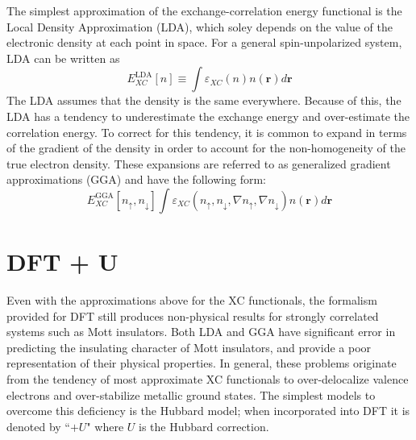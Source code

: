 \documentclass[12pt]{article}
\begin{document}
The simplest approximation of the exchange-correlation energy functional is the Local Density Approximation (LDA), which soley depends on the value of the electronic density at each point in space. For a general spin-unpolarized system, LDA can be written as 
\begin{equation*}
    E_{XC}^{\mathrm{LDA}}[n] \equiv \int \varepsilon_{XC}(n)n(\textbf{r})d\textbf{r}
\end{equation*}
The LDA assumes that the density is the same everywhere. Because of this, the LDA has a tendency to underestimate the exchange energy and over-estimate the correlation energy. To correct for this tendency, it is common to expand in terms of the gradient of the density in order to account for the non-homogeneity of the true electron density. These expansions are referred to as generalized gradient approximations (GGA) and have the following form:
\begin{equation*}
    E_{XC}^{\mathrm{GGA}}[n_{\uparrow},n_{\downarrow}]\int \varepsilon_{XC}(n_{\uparrow},n_{\downarrow},\nabla n_{\uparrow},\nabla n_{\downarrow})n(\textbf{r})d\textbf{r}
\end{equation*}

\section{DFT + U} %

Even with the approximations above for the XC functionals, the formalism provided for DFT still produces non-physical results for strongly correlated systems such as Mott insulators. Both LDA and GGA have significant error in predicting the insulating character of Mott insulators, and provide a poor representation of their physical properties.  In general, these problems originate from the tendency of most approximate XC functionals to over-delocalize valence electrons and over-stabilize metallic ground states. The simplest models to overcome this deficiency is the Hubbard model; when incorporated into DFT it is denoted by ``$+U$" where $U$ is the Hubbard correction.
\end{document}
